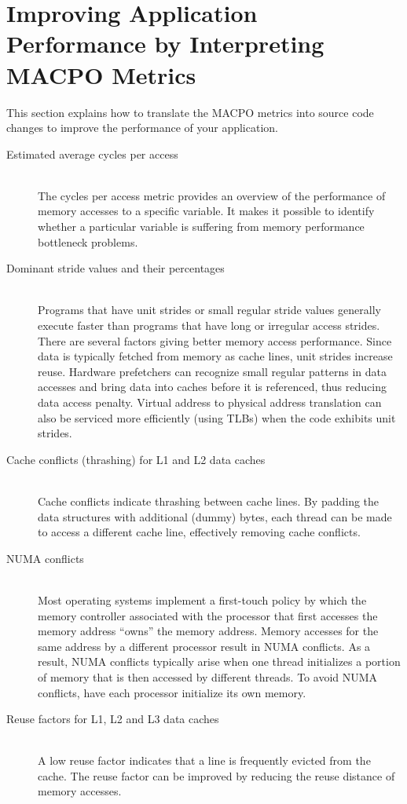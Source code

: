 \section{Improving Application Performance by Interpreting MACPO Metrics}

This section explains how to translate the MACPO metrics into source code changes to improve the performance of your application.

\begin{description}
	\item[Estimated average cycles per access]\hfill \\
	The cycles per access metric provides an overview of the performance of memory accesses to a specific variable. It makes it possible to identify whether a particular variable is suffering from memory performance bottleneck problems.

	\item[Dominant stride values and their percentages]\hfill \\
	Programs that have unit strides or small regular stride values generally execute faster than programs that have long or irregular access strides. There are several factors giving better memory access performance. Since data is typically fetched from memory as cache lines, unit strides increase reuse. Hardware prefetchers can recognize small regular patterns in data accesses and bring data into caches before it is referenced, thus reducing data access penalty. Virtual address to physical address translation can also be serviced more efficiently (using TLBs) when the code exhibits unit strides.

	\item[Cache conflicts (thrashing) for L1 and L2 data caches]\hfill \\
	Cache conflicts indicate thrashing between cache lines. By padding the data structures with additional (dummy) bytes, each thread can be made to access a different cache line, effectively removing cache conflicts.

	\item[NUMA conflicts]\hfill \\
	Most operating systems implement a first-touch policy by which the memory controller associated with the processor that first accesses the memory address ``owns'' the memory address. Memory accesses for the same address by a different processor result in NUMA conflicts.  As a result, NUMA conflicts typically arise when one thread initializes a portion of memory that is then accessed by different threads. To avoid NUMA conflicts, have each processor initialize its own memory.

	\item[Reuse factors for L1, L2 and L3 data caches]\hfill \\
	A low reuse factor indicates that a line is frequently evicted from the cache. The reuse factor can be improved by reducing the reuse distance of memory accesses.
\end{description}
